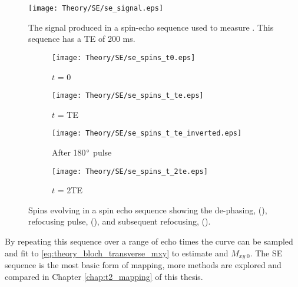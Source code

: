 \begin{figure}[H]
	\centering
	\texttt{[image: Theory/SE/se\_signal.eps]}
	\caption{The signal produced in a spin-echo sequence used to measure \ttwo. This sequence has a \ac{TE} of 200 ms.}
	\label{fig:theory_se_signal}	
\end{figure}

\begin{figure}[H]
	\centering
	\begin{subfigure}[c]{0.24\textwidth}
		\centering
		\texttt{[image: Theory/SE/se\_spins\_t0.eps]}
		\caption{$t$ = 0}
		\label{fig:theory_se_spins_t0}
	\end{subfigure}
	\hfill
	\begin{subfigure}[c]{0.24\textwidth}
		\centering
		\texttt{[image: Theory/SE/se\_spins\_t\_te.eps]}
		\caption{$t$ = TE}
		\label{fig:theory_se_spins_t_te_by_2}
	\end{subfigure}
	\begin{subfigure}[c]{0.24\textwidth}
		\centering
		\texttt{[image: Theory/SE/se\_spins\_t\_te\_inverted.eps]}
		\caption{After 180$\degree$ pulse}
		\label{fig:theory_se_spins_t_te_by_2_inverted}
	\end{subfigure}
	\begin{subfigure}[c]{0.24\textwidth}
		\centering
		\texttt{[image: Theory/SE/se\_spins\_t\_2te.eps]}
		\caption{$t$ = 2TE}
		\label{fig:theory_se_spins_t_te}
	\end{subfigure}
	\caption{Spins evolving in a spin echo sequence showing the de-phasing, (), refocusing pulse, (), and subsequent refocusing, ().}
	\label{fig:theory_se_spins}
\end{figure}

By repeating this sequence over a range of echo times the \ttwo curve can be sampled and fit to \eqref{eq:theory_bloch_transverse_mxy} to estimate \ttwo and $M_{xy\; 0}$. The \ac{SE} sequence is the most basic form of \ttwo mapping, more methods are explored and compared in Chapter \ref{chap:t2_mapping} of this thesis.

